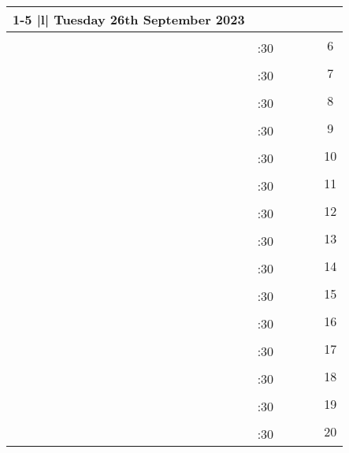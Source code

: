 \documentclass[10pt, a5paper, final, oneside]{memoir}
\newcommand{\grayline}{\arrayrulecolor{lightgray}\cline{1-5}\arrayrulecolor{black}}
\begin{document}
\noindent
\begin{tabularx}{\linewidth}{|c|c|X|X|X|c}

    \cline{1-5}
    \multicolumn{5} {|l|} {Tuesday 26th September 2023} \\
    \hline

    & & & && \multirow{2}{*}{6}\\ 
    \grayline
    & :30 & & &&\\ \hline

    & & & && \multirow{2}{*}{7}\\ 
    \grayline
    & :30 & & &&\\ \hline

    & & & && \multirow{2}{*}{8}\\ 
    \grayline
    & :30 & & &&\\ \hline

    & & & && \multirow{2}{*}{9}\\ 
    \grayline
    & :30 & & &&\\ \hline
    
    & & & && \multirow{2}{*}{10}\\ 
    \grayline
    & :30 & & &&\\ \hline

    & & & && \multirow{2}{*}{11}\\ 
    \grayline
    & :30 & & &&\\ \hline

    & & & && \multirow{2}{*}{12}\\ 
    \grayline
    & :30 & & &&\\ \hline

    & & & && \multirow{2}{*}{13}\\ 
    \grayline
    & :30 & & &&\\ \hline

    & & & && \multirow{2}{*}{14}\\ 
    \grayline
    & :30 & & &&\\ \hline
    
    & & & && \multirow{2}{*}{15}\\ 
    \grayline
    & :30 & & &&\\ \hline

    & & & && \multirow{2}{*}{16}\\ 
    \grayline
    & :30 & & &&\\ \hline

    & & & && \multirow{2}{*}{17}\\ 
    \grayline
    & :30 & & &&\\ \hline

    & & & && \multirow{2}{*}{18}\\ 
    \grayline
    & :30 & & &&\\ \hline

    & & & && \multirow{2}{*}{19}\\ 
    \grayline
    & :30 & & &&\\ \hline
    
    & & & && \multirow{2}{*}{20}\\ 
    \grayline
    & :30 & & &&\\ \hline

\end{tabularx}
\end{document}
